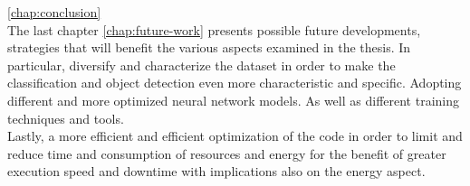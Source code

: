 \ref{chap:conclusion}\\



\noindent The last chapter \ref{chap:future-work} presents possible future
developments, strategies that will benefit the various aspects examined in the
thesis.
In particular, diversify and characterize the dataset in order to make the
classification and object detection even more characteristic and specific.
Adopting different and more optimized neural network models. 
As well as different training techniques and tools.\\ 
Lastly, a more efficient and efficient optimization of the code in order to
limit and reduce time and consumption of resources and energy for the benefit of
greater execution speed and downtime with implications also on the energy
aspect.